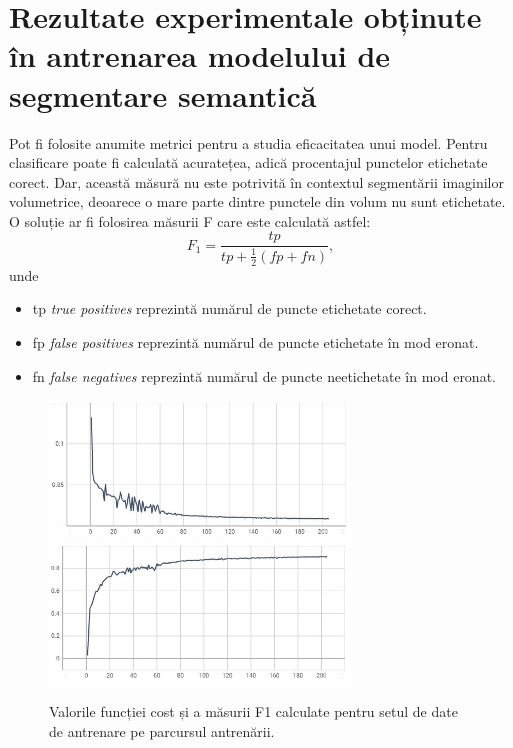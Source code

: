 \section{Rezultate experimentale obținute în antrenarea modelului de segmentare semantică}

Pot fi folosite anumite metrici pentru a studia eficacitatea unui model. Pentru clasificare poate fi calculată acuratețea, adică procentajul punctelor etichetate corect. Dar, această măsură nu este potrivită în contextul segmentării imaginilor volumetrice, deoarece o mare parte dintre punctele din volum nu sunt etichetate. O soluție ar fi folosirea măsurii F care este calculată astfel:
\begin{equation}
    F_1 = \frac{tp}{tp + \frac{1}{2}(fp + fn)},
\end{equation}
unde
\begin{itemize}
  \item[] tp \textit{true positives} reprezintă numărul de puncte etichetate corect.
  \item[] fp \textit{false positives} reprezintă numărul de puncte etichetate în mod eronat.
  \item[] fn \textit{false negatives} reprezintă numărul de puncte neetichetate în mod eronat.
\end{itemize}


\begin{figure}[!htb]
    \centering
    \includegraphics[width=8cm]{images/seg_train_results/training_loss.jpg}
    \includegraphics[width=8cm]{images/seg_train_results/training_f1.jpg}
    \\
    \caption{Valorile funcției cost și a măsurii F1 calculate pentru setul de date de antrenare pe parcursul antrenării.}
    \label{fig:res_training}
\end{figure}

